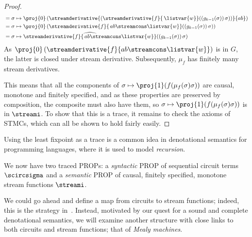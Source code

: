 \begin{proof}
\begin{align*}
         & = \sigma \mapsto \proj{0}\left(\streamderivative{\left(\streamderivative{f}{\, \listvar{w}}(\left(g_{k-1}(\sigma)\right)\sigma)\right)}{ab}\right)    \\
         & = \sigma \mapsto \proj{0}\left(\streamderivative{f}{\, ab \streamcons \listvar{w}}(\left(g_{k-1}(\sigma)\right)\sigma)\right)                         \\
         & = \sigma \mapsto \widehat{\streamderivative{f}{\, ab \streamcons \listvar{w}}}(\left(g_{k-1}(\sigma)\right)\sigma)
    \end{align*}
    As \(\proj{0}\left(\streamderivative{f}{ab \streamcons \listvar{w}}\right)\)
    is in \(G\), the latter  is closed under stream derivative.
    Subsequently, \(\mu_f\) has finitely many stream derivatives.

    This means that all the components of
    \(\sigma \mapsto \proj{1}(f(\mu_f(\sigma)\sigma))\) are causal, monotone and
    finitely specified, and as these properties are preserved by composition,
    the composite must also have them, so
    \(\sigma \mapsto \proj{1}(f(\mu_f(\sigma)\sigma))\) is in \(\streami\).
    To show that this is a trace, it remains to check the axioms of STMCs,
    which can all be shown to hold fairly easily.
\end{proof}

\begin{remark}
    Using the least fixpoint as a trace is a common idea in
    denotational semantics for programming languages, where it is used to
    model \emph{recursion}.
\end{remark}

We now have two traced PROPs: a \emph{syntactic} PROP of sequential circuit
terms \(\scircsigma\) and a \emph{semantic} PROP of causal, finitely
specified, monotone stream functions \(\streami\).

We could go ahead and define a map from circuits to stream functions;
indeed, this is the strategy in~\cite{ghica2024fully}.
Instead, motivated by our quest for a sound and complete denotational semantics,
we will examine another structure with close links to both circuits and stream
functions; that of \emph{Mealy machines}.